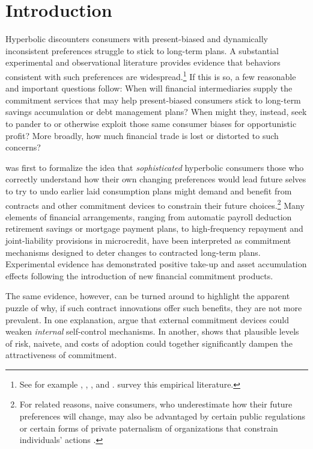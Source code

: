 \documentclass[11pt,english]{article}
\theoremstyle{plain}
\theoremstyle{definition}
\begin{document}
\section{Introduction}

Hyperbolic discounters \textendash{} consumers with present-biased and dynamically inconsistent preferences \textendash{} struggle to stick to long-term plans. A substantial experimental and observational literature provides evidence that behaviors consistent with such preferences are widespread.\footnote{See for example \citet{ariely2002}, \citet{thaler2004}, \citet{ashraf2006}, and \citet{bauer2012}. \citet{bryan2010}
survey this empirical literature.} If this is so, a few reasonable and important questions follow: When will financial intermediaries supply the commitment services that may help present-biased consumers stick to long-term savings accumulation or debt management plans? When might they, instead, seek to pander to or otherwise exploit those same consumer biases for opportunistic profit? More broadly, how much financial trade is lost or distorted to such concerns?

\citet{strotz1956} was first to formalize the idea that \emph{sophisticated} hyperbolic consumers \textendash{} those who correctly understand how their own changing preferences would lead future selves to try to undo earlier laid consumption plans \textendash{} might demand and benefit from contracts and other commitment devices to constrain
their future choices.\footnote{For related reasons, naive consumers, who underestimate how their future preferences will change, may also be advantaged by certain public regulations or certain forms of private paternalism of organizations that constrain individuals' actions \citep{spiegler2011}.} Many elements of financial arrangements, ranging from automatic payroll deduction retirement savings or mortgage payment plans, to high-frequency
repayment and joint-liability provisions in microcredit, have  been interpreted as commitment mechanisms designed to deter changes to contracted long-term plans. Experimental
evidence has demonstrated positive take-up and asset accumulation effects following the introduction of new financial commitment products.

The same evidence, however, can be turned around to highlight the apparent puzzle of why, if such contract innovations offer such benefits, they are not more prevalent. In one explanation, \citet{bernheim2015} argue that external commitment devices could weaken \emph{internal} self-control mechanisms. In another, \citet{laibson2015} shows that plausible levels of risk, naivete, and costs of adoption could together significantly dampen the attractiveness of commitment.
\end{document}
